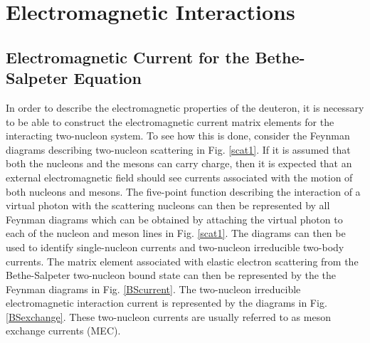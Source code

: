 \documentclass[mythesis.tex]{subfiles}
\begin{document}
\setcounter{chapter}{2} 
\chapter{Electromagnetic Interactions}

\section{Electromagnetic Current for the Bethe-Salpeter Equation}

In order to describe the electromagnetic properties of the deuteron, it is
necessary to be able to construct the electromagnetic current matrix
elements for the interacting two-nucleon system. To see how this is done,
consider the Feynman diagrams describing two-nucleon scattering in Fig.
\ref{scat1}. If it is assumed that both the nucleons and the mesons can
carry
charge, then it is expected that an external electromagnetic field should
see currents associated with the motion of both nucleons and mesons. The
five-point function describing the interaction of a virtual photon with
the scattering nucleons can then be represented by all Feynman diagrams
which can be obtained by attaching the virtual photon to each of the nucleon
and meson lines in Fig. \ref{scat1}. The diagrams can then be used to
identify single-nucleon currents and two-nucleon irreducible two-body
currents. The matrix element associated with elastic electron scattering
from the Bethe-Salpeter two-nucleon bound state can then be represented by
the the Feynman diagrams in Fig. \ref{BScurrent}. The two-nucleon
irreducible
electromagnetic interaction current is represented by the diagrams in
Fig. \ref{BSexchange}. These two-nucleon currents are usually referred to
as meson exchange currents (MEC).
\end{document}
